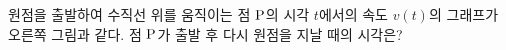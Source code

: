 \noindent\begin{minipage}[t]{0.58\linewidth}\vspace{0pt}\raggedright 원점을 출발하여 수직선 위를 움직이는 점 $\mathrm{P}$의 시각 $t$에서의 속도 $v(t)$의 그래프가 오른쪽 그림과 같다. 점 $\mathrm{P}$가 출발 후 다시 원점을 지날 때의 시각은?\end{minipage}\hfill\begin{minipage}[t]{0.4\linewidth}\vspace{0pt}\centering \resizebox{\ifdim\width>\linewidth\linewidth\else\width\fi}{!}{}\end{minipage}\par
{}
